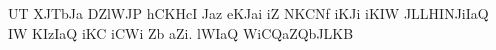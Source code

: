 UT XJTbJa DZlWJP hCKHcI Jaz eKJai iZ NKCNf iKJi iKIW JLLHINJiIaQ IW KIzIaQ iKC iCWi Zb aZi. lWIaQ WiCQaZQbJLKB
